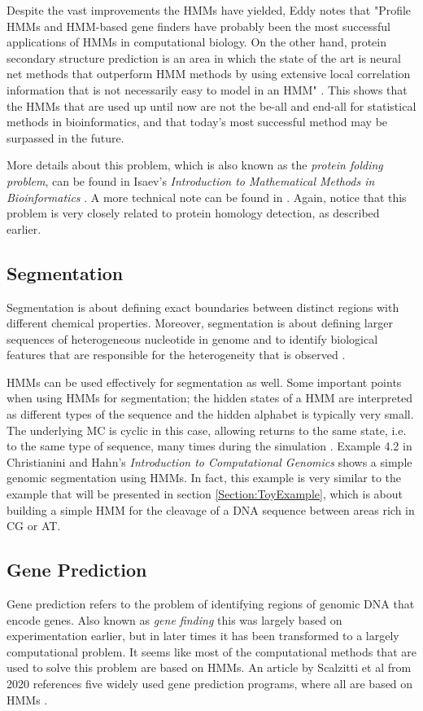 \documentclass{article}\usepackage[]{graphicx}\usepackage[]{color}
\begin{document}
Despite the vast improvements the HMMs have yielded, Eddy notes that "Profile HMMs and HMM-based gene finders have probably been the most successful applications of HMMs in computational biology. On the other hand, protein secondary structure prediction is an area in which the state of the art is neural net methods that outperform HMM methods by using extensive local correlation information that is not necessarily easy to model in an HMM" \cite{Eddy1998}. This shows that the HMMs that are used up until now are not the be-all and end-all for statistical methods in bioinformatics, and that today's most successful method may be surpassed in the future. 

More details about this problem, which is also known as the \textit{protein folding problem}, can be found in Isaev's \textit{Introduction to Mathematical Methods in Bioinformatics} \cite{Isaev2006}. A more technical note can be found in \cite{Choo2004}. Again, notice that this problem is very closely related to protein homology detection, as described earlier. 

\subsection{Segmentation}
Segmentation is about defining exact boundaries between distinct regions with different chemical properties. Moreover, segmentation is about defining larger sequences of heterogeneous nucleotide in genome and to identify biological features that are responsible for the heterogeneity that is observed \cite{Christianini2006}. 

HMMs can be used effectively for segmentation as well. Some important points when using HMMs for segmentation; the hidden states of a HMM are interpreted as different types of the sequence and the hidden alphabet is typically very small. The underlying MC is cyclic in this case, allowing returns to the same state, i.e. to the same type of sequence, many times during the simulation \cite{Christianini2006}. Example 4.2 in Christianini and Hahn's \textit{Introduction to Computational Genomics} shows a simple genomic segmentation using HMMs. In fact, this example is very similar to the example that will be presented in section \ref{Section:ToyExample}, which is about building a simple HMM for the cleavage of a DNA sequence between areas rich in CG or AT. 

\subsection{Gene Prediction}
Gene prediction refers to the problem of identifying regions of genomic DNA that encode genes. Also known as \textit{gene finding} this was largely based on experimentation earlier, but in later times it has been transformed to a largely computational problem. It seems like most of the computational methods that are used to solve this problem are based on HMMs. An article by Scalzitti et al from 2020 references five widely used gene prediction programs, where all are based on HMMs \cite{Scalzitti2020}.
\end{document}
